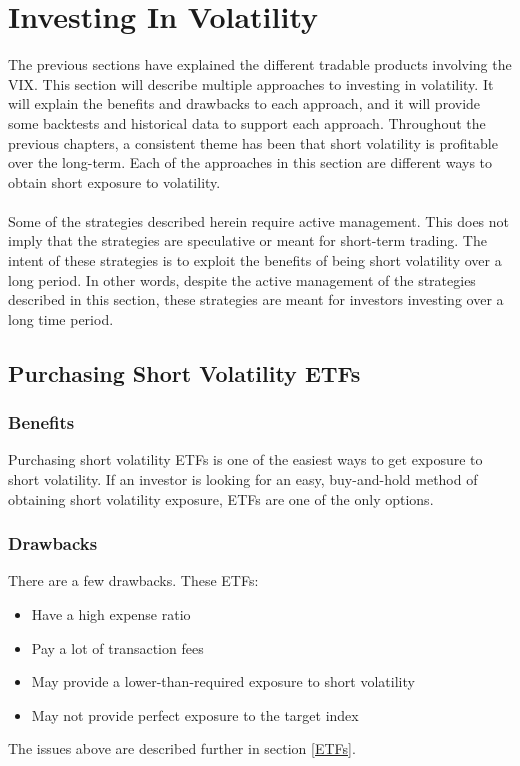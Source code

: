 \documentclass[11pt, oneside]{book}
\begin{document}
\chapter{Investing In Volatility} \label{Investing}
The previous sections have explained the different tradable products involving the VIX. This section will describe multiple approaches to investing in volatility. It will explain the benefits and drawbacks to each approach, and it will provide some backtests and historical data to support each approach. Throughout the previous chapters, a consistent theme has been that short volatility is profitable over the long-term. Each of the approaches in this section are different ways to obtain short exposure to volatility.\\
\\
Some of the strategies described herein require active management. This does not imply that the strategies are speculative or meant for short-term trading. The intent of these strategies is to exploit the benefits of being short volatility over a long period. In other words, despite the active management of the strategies described in this section, these strategies are meant for investors investing over a long time period.

\section{Purchasing Short Volatility ETFs} \label{Investing-PurchETF}
\subsection{Benefits} \label{Investing-PurchETF-Benefit}
Purchasing short volatility ETFs is one of the easiest ways to get exposure to short volatility. If an investor is looking for an easy, buy-and-hold method of obtaining short volatility exposure, ETFs are one of the only options. 

\subsection{Drawbacks} \label{Investing-PurchETF-Drawback}
There are a few drawbacks. These ETFs:
\begin{itemize}
    \item Have a high expense ratio
    \item Pay a lot of transaction fees
    \item May provide a lower-than-required exposure to short volatility
    \item May not provide perfect exposure to the target index
\end{itemize}
The issues above are described further in section \ref{ETFs}.
\end{document}
